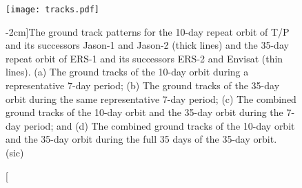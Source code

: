 \begin{figure}
\texttt{[image: tracks.pdf]}
\caption[][-2cm]{The ground track patterns for the 10-day repeat orbit of T/P and its successors Jason-1 and Jason-2 (thick lines) and the 35-day repeat orbit of ERS-1 and its successors ERS-2 and Envisat (thin lines). (a) The ground tracks of the 10-day orbit during a representative 7-day period; (b) The ground tracks of the 35-day orbit during the same representative 7-day period; (c) The combined ground tracks of the 10-day orbit and the 35-day orbit during the 7-day period; and (d) The combined ground tracks of the 10-day orbit and the 35-day orbit during the full 35 days of the 35-day orbit. (sic) \citep{Chelton2011}}
\end{figure}

